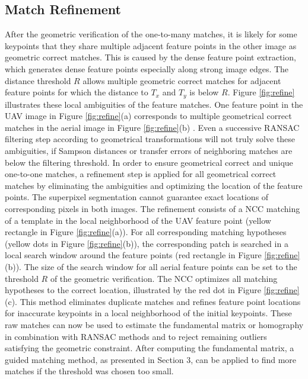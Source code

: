 \subsection{Match Refinement}
After the geometric verification of the one-to-many matches, it is likely for some keypoints that they share multiple adjacent feature points in the other image as geometric correct matches.
This is caused by the dense feature point extraction, which generates dense feature points especially along strong image edges. 
The distance threshold $R$ allows multiple geometric correct matches for adjacent feature points for which the distance to $T_x$ and $T_y$ is below $R$.
Figure \ref{fig:refine} illustrates these local ambiguities of the feature matches.
One feature point in the UAV image in Figure \ref{fig:refine}(a) corresponds to multiple geometrical correct matches in the aerial image in Figure \ref{fig:refine}(b) .
Even a successive RANSAC filtering step according to geometrical transformations will not truly solve these ambiguities, if Sampson distances or transfer errors of neighboring matches are below the filtering threshold.
In order to ensure geometrical correct and unique one-to-one matches, a refinement step is applied for all geometrical correct matches by eliminating the ambiguities and optimizing the location of the feature points. 
The superpixel segmentation cannot guarantee exact locations of corresponding pixels in both images. 
The refinement consists of a NCC matching of a template in the local neighborhood of the UAV feature point (yellow rectangle in Figure \ref{fig:refine}(a)).
For all corresponding matching hypotheses (yellow dots in Figure \ref{fig:refine}(b)), the corresponding patch is searched in a local search window around the feature points (red rectangle in Figure \ref{fig:refine}(b)).
The size of the search window for all aerial feature points can be set to the threshold $R$ of the geometric verification. 
The NCC optimizes all matching hypotheses to the correct location, illustrated by the red dot in Figure \ref{fig:refine}(c). 
This method eliminates duplicate matches and refines feature point locations for inaccurate keypoints in a local neighborhood of the initial keypoints. 
These raw matches can now be used to estimate the fundamental matrix or homography in combination with RANSAC methods and to reject remaining outliers satisfying the geometric constraint. 
After computing the fundamental matrix, a guided matching method, as presented in Section 3, can be applied to find more matches if the threshold was chosen too small.
